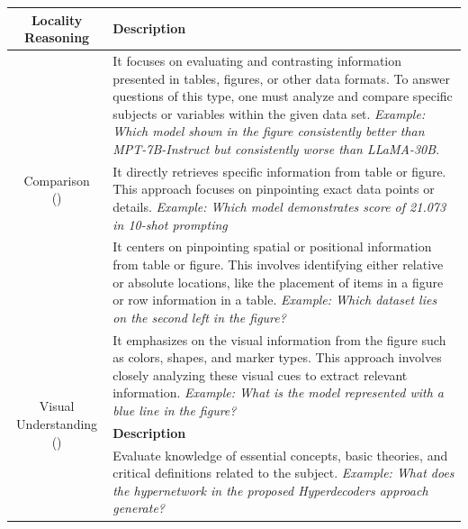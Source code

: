 \begin{table}[!t]
\centering
\small
\renewcommand\tabcolsep{1.0pt} %
\begin{tabular}{cp{11.5cm}}
    \toprule
    \textbf{Locality Reasoning} & \textbf{Description} \\
    \midrule
    \multirow{3}{*}{\parbox{4cm}{\centering Comparison \\ \centering()}}
    &  It focuses on evaluating and contrasting information presented in tables, figures, or other data formats. To answer questions of this type, one must analyze and compare specific subjects or variables within the given data set. \emph{Example: Which model shown in the figure consistently better than MPT-7B-Instruct but consistently worse than LLaMA-30B}. \\
    \midrule
    \multirow{3}{*}{\parbox{4cm}{\centering Data Extraction \\ \centering()}}
    &  It directly retrieves specific information from table or figure. This approach focuses on pinpointing exact data points or details. \emph{Example: Which model demonstrates score of 21.073 in 10-shot prompting}\\
    \midrule
    \multirow{3}{*}{\parbox{4cm}{\centering Location  \\ \centering()}}
    &  It centers on pinpointing spatial or positional information from table or figure. This involves identifying either relative or absolute locations, like the placement of items in a figure or row information in a table. \emph{Example: Which dataset lies on the second left in the figure?}\\
    \midrule
    \multirow{3}{*}{\parbox{4cm}{\centering Visual Understanding \\ \centering()}}
    & It emphasizes on the visual information from the figure such as colors, shapes, and marker types. This approach involves closely analyzing these visual cues to extract relevant information. \emph{Example: What is the model represented with a blue line in the figure?}\\
    \toprule
    \textbf{Detail Reasoning} & \textbf{Description} \\
    \midrule
    \multirow{3}{*}{\parbox{4cm}{\centering Conceptual Understanding \\ \centering()}}
    &  Evaluate knowledge of essential concepts, basic theories, and critical definitions related to the subject. \emph{Example: What does the hypernetwork in the proposed Hyperdecoders approach generate?}\\

\end{tabular}
\end{table}
